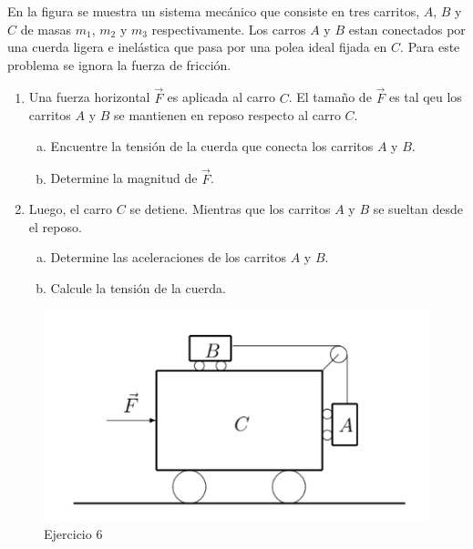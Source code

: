








\begin{mdframed}[style=warning]
	\begin{ejercicio}
		En la figura se muestra un sistema mecánico que consiste en tres carritos, $A$, $B$ y $C$ de masas $m_1$, $m_2$ y $m_3$ respectivamente. Los carros $A$ y $B$ estan conectados por una cuerda ligera e inelástica que pasa por una polea ideal fijada en $C$. Para este problema se ignora la fuerza de fricción.
	\begin{enumerate}
		\item Una fuerza horizontal $\vec{F}$ es aplicada al carro $C$. El tamaño de $\vec{F}$ es tal qeu los carritos $A$ y $B$ se mantienen en reposo respecto al carro $C$.
		\begin{enumerate}[a)]
			\item Encuentre la tensión de la cuerda que conecta los carritos $A$ y $B$.
			\item Determine la magnitud de $\vec{F}$.
		\end{enumerate}
		\item Luego, el carro $C$ se detiene. Mientras que los carritos $A$ y $B$ se sueltan desde el reposo.
		\begin{enumerate}[a)]
			\item Determine las aceleraciones de los carritos $A$ y $B$.
			\item Calcule la tensión de la cuerda.
		\end{enumerate}
	\end{enumerate}
		\begin{figure}[H]
			\centering
			\includegraphics[scale=0.4]{./img/carrito.png}
			\caption{Ejercicio 6}
		\end{figure}
	\end{ejercicio}

\end{mdframed}
